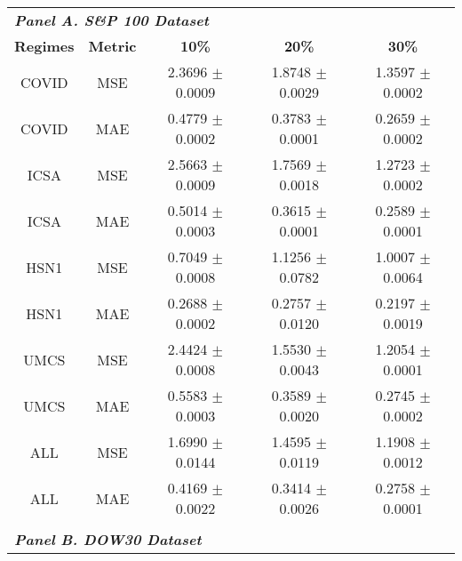 \centering
{\fontsize{8pt}{11pt}\selectfont
\begin{tabular}{ccccc}
\hline
\multicolumn{5}{l}{\textit{\textbf{Panel A. S\&P 100 Dataset}}}                                                                              \\
\textbf{Regimes}                     & \textbf{Metric}                     & \textbf{10\%}       & \textbf{20\%}       & \textbf{30\%}       \\ \hline
COVID                                & MSE                                 & 2.3696 $\pm$ 0.0009 & 1.8748 $\pm$ 0.0029 & 1.3597 $\pm$ 0.0002 \\
COVID                                & MAE                                 & 0.4779 $\pm$ 0.0002 & 0.3783 $\pm$ 0.0001 & 0.2659 $\pm$ 0.0002 \\ \hline
ICSA                                 & MSE                                 & 2.5663 $\pm$ 0.0009 & 1.7569 $\pm$ 0.0018 & 1.2723 $\pm$ 0.0002 \\
ICSA                                 & MAE                                 & 0.5014 $\pm$ 0.0003 & 0.3615 $\pm$ 0.0001 & 0.2589 $\pm$ 0.0001 \\ \hline
HSN1                                 & MSE                                 & 0.7049 $\pm$ 0.0008 & 1.1256 $\pm$ 0.0782 & 1.0007 $\pm$ 0.0064 \\
HSN1                                 & MAE                                 & 0.2688 $\pm$ 0.0002 & 0.2757 $\pm$ 0.0120 & 0.2197 $\pm$ 0.0019 \\ \hline
UMCS                                 & MSE                                 & 2.4424 $\pm$ 0.0008 & 1.5530 $\pm$ 0.0043 & 1.2054 $\pm$ 0.0001 \\
UMCS                                 & MAE                                 & 0.5583 $\pm$ 0.0003 & 0.3589 $\pm$ 0.0020 & 0.2745 $\pm$ 0.0002 \\ \hline
ALL                                  & MSE                                 & 1.6990 $\pm$ 0.0144 & 1.4595 $\pm$ 0.0119 & 1.1908 $\pm$ 0.0012 \\
ALL                                  & MAE                                 & 0.4169 $\pm$ 0.0022 & 0.3414 $\pm$ 0.0026 & 0.2758 $\pm$ 0.0001 \\ \hline
\multicolumn{5}{l}{}                                                                                                                         \\ \hline
\multicolumn{5}{l}{\textit{\textbf{Panel B. DOW30 Dataset}}}                                                                                 \\

\end{tabular}}
